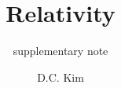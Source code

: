 \documentclass[graybox,envcountchap,sectrefs]{style/svmono}
\begin{document}
\author{D.C. Kim}
\title{Relativity}
\subtitle{supplementary note}
\maketitle

\frontmatter%

%
%
%
%

\tableofcontents




\mainmatter%


%


\backmatter%


\printindex

\end{document}

